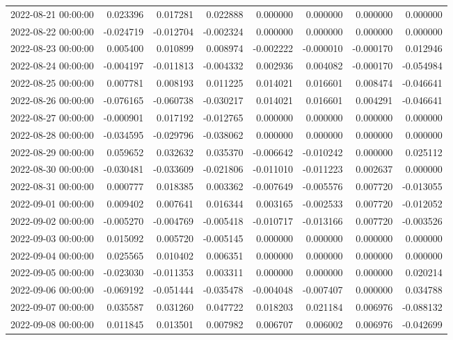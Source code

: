 \begin{tabular}{lrrrrrrr}
2022-08-21 00:00:00 & 0.023396 & 0.017281 & 0.022888 & 0.000000 & 0.000000 & 0.000000 & 0.000000 \\
2022-08-22 00:00:00 & -0.024719 & -0.012704 & -0.002324 & 0.000000 & 0.000000 & 0.000000 & 0.000000 \\
2022-08-23 00:00:00 & 0.005400 & 0.010899 & 0.008974 & -0.002222 & -0.000010 & -0.000170 & 0.012946 \\
2022-08-24 00:00:00 & -0.004197 & -0.011813 & -0.004332 & 0.002936 & 0.004082 & -0.000170 & -0.054984 \\
2022-08-25 00:00:00 & 0.007781 & 0.008193 & 0.011225 & 0.014021 & 0.016601 & 0.008474 & -0.046641 \\
2022-08-26 00:00:00 & -0.076165 & -0.060738 & -0.030217 & 0.014021 & 0.016601 & 0.004291 & -0.046641 \\
2022-08-27 00:00:00 & -0.000901 & 0.017192 & -0.012765 & 0.000000 & 0.000000 & 0.000000 & 0.000000 \\
2022-08-28 00:00:00 & -0.034595 & -0.029796 & -0.038062 & 0.000000 & 0.000000 & 0.000000 & 0.000000 \\
2022-08-29 00:00:00 & 0.059652 & 0.032632 & 0.035370 & -0.006642 & -0.010242 & 0.000000 & 0.025112 \\
2022-08-30 00:00:00 & -0.030481 & -0.033609 & -0.021806 & -0.011010 & -0.011223 & 0.002637 & 0.000000 \\
2022-08-31 00:00:00 & 0.000777 & 0.018385 & 0.003362 & -0.007649 & -0.005576 & 0.007720 & -0.013055 \\
2022-09-01 00:00:00 & 0.009402 & 0.007641 & 0.016344 & 0.003165 & -0.002533 & 0.007720 & -0.012052 \\
2022-09-02 00:00:00 & -0.005270 & -0.004769 & -0.005418 & -0.010717 & -0.013166 & 0.007720 & -0.003526 \\
2022-09-03 00:00:00 & 0.015092 & 0.005720 & -0.005145 & 0.000000 & 0.000000 & 0.000000 & 0.000000 \\
2022-09-04 00:00:00 & 0.025565 & 0.010402 & 0.006351 & 0.000000 & 0.000000 & 0.000000 & 0.000000 \\
2022-09-05 00:00:00 & -0.023030 & -0.011353 & 0.003311 & 0.000000 & 0.000000 & 0.000000 & 0.020214 \\
2022-09-06 00:00:00 & -0.069192 & -0.051444 & -0.035478 & -0.004048 & -0.007407 & 0.000000 & 0.034788 \\
2022-09-07 00:00:00 & 0.035587 & 0.031260 & 0.047722 & 0.018203 & 0.021184 & 0.006976 & -0.088132 \\
2022-09-08 00:00:00 & 0.011845 & 0.013501 & 0.007982 & 0.006707 & 0.006002 & 0.006976 & -0.042699 \\

\end{tabular}

